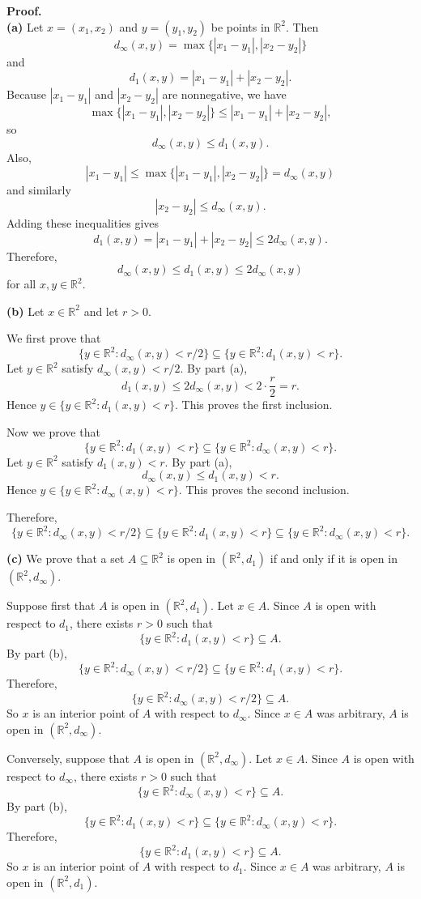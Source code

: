 \documentclass[12pt]{article}
\begin{document}
\textbf{Proof.}\\
\textbf{(a)} Let $x=(x_1,x_2)$ and $y=(y_1,y_2)$ be points in $\mathbb{R}^2$. Then
\[
d_\infty(x,y)=\max\{|x_1-y_1|,|x_2-y_2|\}
\]
and
\[
d_1(x,y)=|x_1-y_1|+|x_2-y_2|.
\]
Because $|x_1-y_1|$ and $|x_2-y_2|$ are nonnegative, we have
\[
\max\{|x_1-y_1|,|x_2-y_2|\}\le |x_1-y_1|+|x_2-y_2|,
\]
so
\[
d_\infty(x,y)\le d_1(x,y).
\]
Also,
\[
|x_1-y_1|\le \max\{|x_1-y_1|,|x_2-y_2|\}=d_\infty(x,y)
\]
and similarly
\[
|x_2-y_2|\le d_\infty(x,y).
\]
Adding these inequalities gives
\[
d_1(x,y)=|x_1-y_1|+|x_2-y_2|\le 2d_\infty(x,y).
\]
Therefore,
\[
d_\infty(x,y)\le d_1(x,y)\le 2d_\infty(x,y)
\]
for all $x,y\in\mathbb{R}^2$.

\textbf{(b)} Let $x\in\mathbb{R}^2$ and let $r>0$.

We first prove that
\[
\{y\in\mathbb{R}^2:d_\infty(x,y)<r/2\}\subseteq \{y\in\mathbb{R}^2:d_1(x,y)<r\}.
\]
Let $y\in\mathbb{R}^2$ satisfy $d_\infty(x,y)<r/2$. By part (a),
\[
d_1(x,y)\le 2d_\infty(x,y)<2\cdot \frac r2=r.
\]
Hence $y\in\{y\in\mathbb{R}^2:d_1(x,y)<r\}$. This proves the first inclusion.

Now we prove that
\[
\{y\in\mathbb{R}^2:d_1(x,y)<r\}\subseteq \{y\in\mathbb{R}^2:d_\infty(x,y)<r\}.
\]
Let $y\in\mathbb{R}^2$ satisfy $d_1(x,y)<r$. By part (a),
\[
d_\infty(x,y)\le d_1(x,y)<r.
\]
Hence $y\in\{y\in\mathbb{R}^2:d_\infty(x,y)<r\}$. This proves the second inclusion.

Therefore,
\[
\{y\in\mathbb{R}^2:d_\infty(x,y)<r/2\}\subseteq
\{y\in\mathbb{R}^2:d_1(x,y)<r\}\subseteq
\{y\in\mathbb{R}^2:d_\infty(x,y)<r\}.
\]

\textbf{(c)} We prove that a set $A\subseteq\mathbb{R}^2$ is open in $(\mathbb{R}^2,d_1)$ if and only if it is open in $(\mathbb{R}^2,d_\infty)$.

Suppose first that $A$ is open in $(\mathbb{R}^2,d_1)$. Let $x\in A$. Since $A$ is open with respect to $d_1$, there exists $r>0$ such that
\[
\{y\in\mathbb{R}^2:d_1(x,y)<r\}\subseteq A.
\]
By part (b),
\[
\{y\in\mathbb{R}^2:d_\infty(x,y)<r/2\}\subseteq
\{y\in\mathbb{R}^2:d_1(x,y)<r\}.
\]
Therefore,
\[
\{y\in\mathbb{R}^2:d_\infty(x,y)<r/2\}\subseteq A.
\]
So $x$ is an interior point of $A$ with respect to $d_\infty$. Since $x\in A$ was arbitrary, $A$ is open in $(\mathbb{R}^2,d_\infty)$.

Conversely, suppose that $A$ is open in $(\mathbb{R}^2,d_\infty)$. Let $x\in A$. Since $A$ is open with respect to $d_\infty$, there exists $r>0$ such that
\[
\{y\in\mathbb{R}^2:d_\infty(x,y)<r\}\subseteq A.
\]
By part (b),
\[
\{y\in\mathbb{R}^2:d_1(x,y)<r\}\subseteq
\{y\in\mathbb{R}^2:d_\infty(x,y)<r\}.
\]
Therefore,
\[
\{y\in\mathbb{R}^2:d_1(x,y)<r\}\subseteq A.
\]
So $x$ is an interior point of $A$ with respect to $d_1$. Since $x\in A$ was arbitrary, $A$ is open in $(\mathbb{R}^2,d_1)$.
\end{document}
